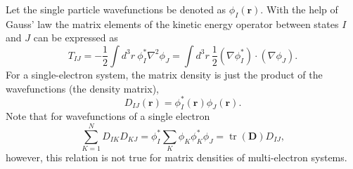 \documentclass[journal=jpclcd,manuscript=letter]{achemso}
\DeclareMathOperator{\tr}{tr}
\newcommand\m[1]{\mathbf{#1}}
\renewcommand\vec[1]{\mathbf{#1}}
\begin{document}
Let the single particle wavefunctions be denoted as $\phi_I(\vec{r})$. With the help of Gauss' law
the matrix elements of the kinetic energy operator between states $I$ and $J$ can be expressed as
\begin{equation}
    T_{IJ} = -\frac{1}{2} \int d^3\!r ~ \phi^*_I \nabla^2 \phi_J
    = \int d^3\!r ~ \frac{1}{2} (\nabla \phi^*_I)\cdot (\nabla \phi_J). \label{eqn:kinetic_energy_1e}
\end{equation}
For a single-electron system, the matrix density is just the product of the wavefunctions (the density matrix),
\begin{equation}
 D_{IJ}(\vec{r}) = \phi^*_I(\vec{r}) \phi_J(\vec{r}).
\end{equation}
Note that for wavefunctions of a single electron
\begin{equation}
 \sum_{K=1}^{N} D_{IK} D_{KJ} = \phi^*_I \sum_{K} \phi_{K} \phi^*_{K} \phi_J = \tr(\m{D}) D_{IJ},
\end{equation}
however, this relation is not true for matrix densities of multi-electron systems.
\end{document}
